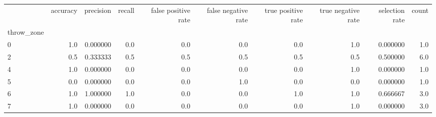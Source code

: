 \begin{tabular}{lrrrrrrrrr}
\toprule
{} &  accuracy &  precision &  recall &  false positive rate &  false negative rate &  true positive rate &  true negative rate &  selection rate &  count \\
throw\_zone &           &            &         &                      &                      &                     &                     &                 &        \\
\midrule
0          &       1.0 &   0.000000 &     0.0 &                  0.0 &                  0.0 &                 0.0 &                 1.0 &        0.000000 &    1.0 \\
2          &       0.5 &   0.333333 &     0.5 &                  0.5 &                  0.5 &                 0.5 &                 0.5 &        0.500000 &    6.0 \\
4          &       1.0 &   0.000000 &     0.0 &                  0.0 &                  0.0 &                 0.0 &                 1.0 &        0.000000 &    1.0 \\
5          &       0.0 &   0.000000 &     0.0 &                  0.0 &                  1.0 &                 0.0 &                 0.0 &        0.000000 &    1.0 \\
6          &       1.0 &   1.000000 &     1.0 &                  0.0 &                  0.0 &                 1.0 &                 1.0 &        0.666667 &    3.0 \\
7          &       1.0 &   0.000000 &     0.0 &                  0.0 &                  0.0 &                 0.0 &                 1.0 &        0.000000 &    3.0 \\
\bottomrule
\end{tabular}
